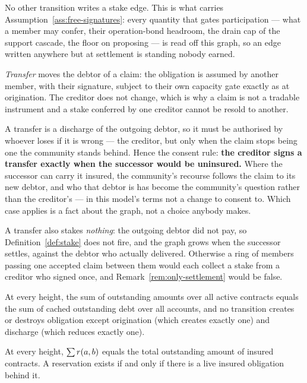 \begin{remark}
\label{rem:only-settlement}
No other transition writes a stake edge. This is what carries
Assumption~\ref{ass:free-signatures}: every quantity that gates participation --- what a
member may confer, their operation-bond headroom, the drain cap of the support cascade,
the floor on proposing --- is read off this graph, so an edge written anywhere but at
settlement is standing nobody earned.
\end{remark}

\emph{Transfer} moves the debtor of a claim: the obligation is assumed by another member,
with their signature, subject to their own capacity gate exactly as at origination. The
creditor does not change, which is why a claim is not a tradable instrument and a stake
conferred by one creditor cannot be resold to another.

A transfer is a discharge of the outgoing debtor, so it must be authorised by whoever
loses if it is wrong --- the creditor, but only when the claim stops being one the
community stands behind. Hence the consent rule: \textbf{the creditor signs a transfer
exactly when the successor would be uninsured.} Where the successor can carry it insured,
the community's recourse follows the claim to its new debtor, and who that debtor is has
become the community's question rather than the creditor's --- in this model's terms not a
change to consent to. Which case applies is a fact about the graph, not a choice anybody
makes.

A transfer also stakes \emph{nothing}: the outgoing debtor did not pay, so
Definition~\ref{def:stake} does not fire, and the graph grows when the successor settles,
against the debtor who actually delivered. Otherwise a ring of members passing one
accepted claim between them would each collect a stake from a creditor who signed once,
and Remark~\ref{rem:only-settlement} would be false.

\begin{invariant}[Conservation]
\label{inv:conservation}
At every height, the sum of outstanding amounts over all active contracts equals the sum
of cached outstanding debt over all accounts, and no transition creates or destroys
obligation except origination (which creates exactly one) and discharge (which reduces
exactly one).
\end{invariant}

\begin{invariant}
\label{inv:res-conservation}
At every height, $\sum r(a,b)$ equals the total outstanding amount of insured
contracts. A reservation exists if and only if there is a live insured obligation behind
it.
\end{invariant}

